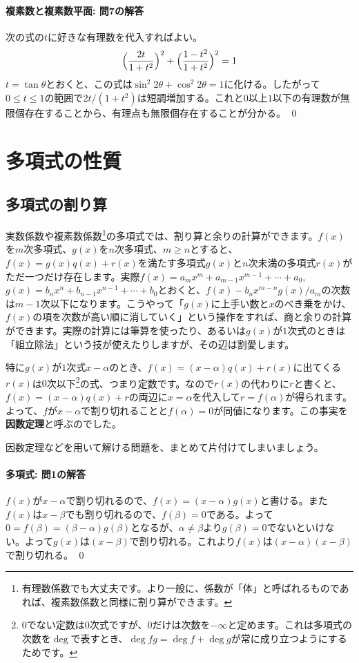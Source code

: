 \paragraph{複素数と複素数平面: 問7の解答} 
次の式の$t$に好きな有理数を代入すればよい。
\[
\Bigl(\frac{2t}{1+t^2}\Bigr)^2 + \Bigl(\frac{1-t^2}{1+t^2}\Bigr)^2 = 1
\]
$t=\tan\theta$とおくと、この式は$\sin^2 2\theta+\cos^2 2\theta=1$に化ける。したがって$0\leq t \leq 1$の範囲で$2t/(1+t^2)$は短調増加する。これと$0$以上$1$以下の有理数が無限個存在することから、有理点も無限個存在することが分かる。 \qed 

\section{多項式の性質}

\subsection{多項式の割り算}

実数係数や複素数係数\footnote{有理数係数でも大丈夫です。より一般に、係数が「体」と呼ばれるものであれば、複素数係数と同様に割り算ができます。}の多項式では、割り算と余りの計算ができます。$f(x)$を$m$次多項式、$g(x)$を$n$次多項式、$m\geq n$とすると、$f(x)=g(x)q(x)+r(x)$を満たす多項式$g(x)$と$n$次未満の多項式$r(x)$がただ一つだけ存在します。実際$f(x) = a_m x^m + a_{m-1}x^{m-1} + \cdots + a_0$, $g(x) = b_n x^n + b_{n-1} x^{n-1} +\cdots + b_0$とおくと、$f(x) - b_n x^{m-n} g(x) / a_m$の次数は$m-1$次以下になります。こうやって「$g(x)$に上手い数と$x$のべき乗をかけ、$f(x)$の項を次数が高い順に消していく」という操作をすれば、商と余りの計算ができます。実際の計算には筆算を使ったり、あるいは$g(x)$が$1$次式のときは「組立除法」という技が使えたりしますが、その辺は割愛します。

特に$g(x)$が$1$次式$x-\alpha$のとき、$f(x)=(x-\alpha)q(x)+r(x)$に出てくる$r(x)$は$0$次以下\footnote{$0$でない定数は$0$次式ですが、$0$だけは次数を$-\infty$と定めます。これは多項式の次数を$\deg$で表すとき、$\deg fg=\deg f + \deg g$が常に成り立つようにするためです。}の式、つまり定数です。なので$r(x)$の代わりに$r$と書くと、$f(x)=(x-\alpha)q(x)+r$の両辺に$x=\alpha$を代入して$r=f(\alpha)$が得られます。よって、$f$が$x-\alpha$で割り切れることと$f(\alpha)=0$が同値になります。この事実を\textbf{因数定理}と呼ぶのでした。

因数定理などを用いて解ける問題を、まとめて片付けてしまいましょう。


\paragraph{多項式: 問1の解答}
$f(x)$が$x-\alpha$で割り切れるので、$f(x)=(x-\alpha)g(x)$と書ける。また$f(x)$は$x-\beta$でも割り切れるので、$f(\beta)=0$である。よって$0=f(\beta)=(\beta-\alpha)g(\beta)$となるが、$\alpha\neq\beta$より$g(\beta)=0$でないといけない。よって$g(x)$は$(x-\beta)$で割り切れる。これより$f(x)$は$(x-\alpha)(x-\beta)$で割り切れる。 \qed

